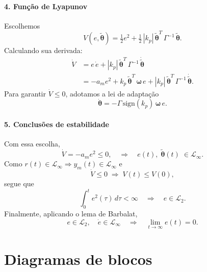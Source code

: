\documentclass[10pt]{article}
\newcommand{\bm}[1]{\boldsymbol{#1}}
\begin{document}
\paragraph{4. Função de Lyapunov}
Escolhemos
\begin{equation}
  V(e,\tilde{\bm{\theta}})
  = \tfrac12 e^2 + \tfrac12\,|k_p|\,\tilde{\bm{\theta}}^T\,\Gamma^{-1}\,\tilde{\bm{\theta}}.
\end{equation}
Calculando sua derivada:
\begin{equation}
  \begin{aligned}
  \dot V
  &= e\,\dot e
   + |k_p|\,\tilde{\bm{\theta}}^T\,\Gamma^{-1}\,\dot{\tilde{\bm{\theta}}} \\
  &= -a_m e^2
     + k_p\,\tilde{\bm{\theta}}^T\,\bm{\omega}\,e
     + |k_p|\,\tilde{\bm{\theta}}^T\,\Gamma^{-1}\,\dot{\tilde{\bm{\theta}}}.
  \end{aligned}
\end{equation}
Para garantir $\dot V\le0$, adotamos a lei de adaptação
\begin{equation}
  \dot{\bm{\theta}}
  = -\Gamma\,\mathrm{sign}(k_p)\,\bm{\omega}\,e.
\end{equation}

\paragraph{5. Conclusões de estabilidade}
Com essa escolha,
\begin{equation}
  \dot V = -a_m e^2 \le 0,
  \quad\Longrightarrow\quad
  e(t),\;\tilde{\bm{\theta}}(t)\;\in\mathcal L_\infty.
\end{equation}
Como $r(t)\in\mathcal L_\infty\Rightarrow y_m(t)\in\mathcal L_\infty$ e
\begin{equation}
  \dot V \le0 \;\Longrightarrow\; V(t)\le V(0),
\end{equation}
segue que
\begin{equation}
  \int_0^t e^2(\tau)\,d\tau < \infty
  \quad\Longrightarrow\quad
  e \in \mathcal L_2.
\end{equation}
Finalmente, aplicando o lema de Barbalat,
\begin{equation}
  e\in\mathcal L_2,\quad \dot e\in\mathcal L_\infty
  \quad\Longrightarrow\quad
  \lim_{t\to\infty} e(t) = 0.
\end{equation}

\section{Diagramas de blocos}
\end{document}
